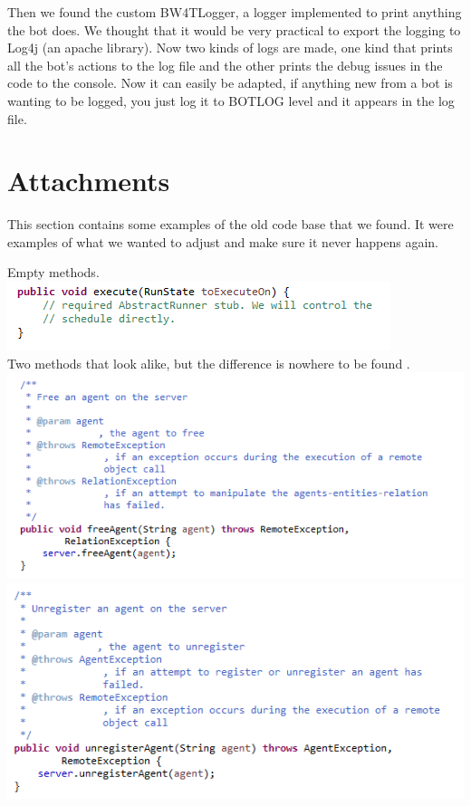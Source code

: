 \documentclass[11pt,a4paper]{article}
\begin{document}
\indent Then we found the custom BW4TLogger, a logger implemented to print anything the bot does. We thought that it would be very practical to export the logging to Log4j (an apache library). Now two kinds of logs are made, one kind that prints all the bot's actions to the log file and the other prints the debug issues in the code to the console. Now it can easily be adapted, if anything new from a bot is wanting to be logged, you just log it to BOTLOG level and it appears in the log file.

\newpage
\section*{Attachments} 
This section contains some examples of the old code base that we found. It were examples of what we wanted to adjust and make sure it never happens again.

Empty methods.\\
\includegraphics[width=\linewidth]{emptyMethod.PNG} \\ 

Two methods that look alike, but the difference is nowhere to be found .\\
\includegraphics[width=\linewidth]{freeAgentNoClue.PNG}
\includegraphics[width=\linewidth]{unregisterAgentNoClue.PNG} \\ 
\end{document}
